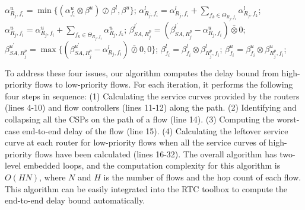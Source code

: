 \documentclass[10pt,journal]{IEEEtran}
\begin{document}
\begin{algorithm}
\begin{algorithmic}[1]
                \STATE $\alpha^u_{R_j,f_i}=\min\{(\alpha^u_{f_i}\otimes\beta^u)\oslash\beta^l,\beta^u\}$;
                    \STATE $\alpha^l_{R_j,f_i}=\alpha^l_{R_j,f_i}+\sum_{f_k\in\Theta_{R_j,f_i}}\alpha^l_{R_j,f_k}$;
                    \STATE $\alpha^u_{R_j,f_i}=\alpha^u_{R_j,f_i}+\sum_{f_k\in\Theta_{R_j,f_i}}\alpha^u_{R_j,f_k}$;
                    \STATE $\beta^{l^\prime}_{SA,R_j^{p}}=(\beta^{l^\prime}_{SA,R_j^{p}}-\alpha^u_{R_j,f_i})\bar{\otimes}0$;
                    \STATE $\beta^{u^\prime}_{SA,R_j^{p}}=\max\{(\beta^{u^\prime}_{SA,R_j^{p}}-\alpha^l_{R_j,f_i})\bar{\oslash}0,0\}$;
                \ENDIF
            \ENDIF
            \STATE $\beta_{f_i}^l=\beta_{f_i}^l\otimes\beta^l_{R_j^{p},f_i}$; $\beta_{f_i}^u=\beta_{f_i}^u\otimes\beta^u_{R_j^{p},f_i}$;
        \ENDFOR
    \ENDFOR
\end{algorithmic}
\end{algorithm}

To address these four issues, our algorithm computes the delay bound from high-priority flows to low-priority flows. For each iteration, it performs the following four steps in sequence: (1) Calculating the service curves provided by the routers (lines 4-10) and flow controllers (lines 11-12) along the path. (2) Identifying and collapsing all the CSPs on the path of a flow (line 14). (3) Computing the worst-case end-to-end delay of the flow (line 15). (4) Calculating the leftover service curve at each router for low-priority flows when all the service curves of high-priority flows have been calculated (lines 16-32). The overall algorithm has two-level embedded loops, and the computation complexity for this algorithm is $O(HN)$, where $N$ and $H$ is the number of flows and the hop count of each flow. This algorithm can be easily integrated into the RTC toolbox \cite{rtc} to compute the end-to-end delay bound automatically.
\end{document}
